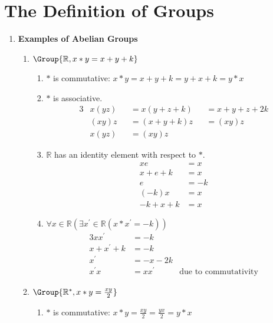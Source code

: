 \setcounter{chapter}{2}
\chapter{The Definition of Groups}
\label{ch:the-definition-of-groups}

\begin{enumerate}[label={\Alph*.},font={\bfseries}]
\item {\bf Examples of Abelian Groups}
  \begin{enumerate}[label={\arabic*},font={\bfseries}]
  \item $\Group{\mathbb{R}, x*y=x+y+k}$
    \begin{enumerate}[label={(\roman*)}]
    \item $*$ is commutative:
      $x*y=x+y+k = y+x+k=y*x$
    \item $*$ is associative.
      \begin{alignat*}{3}
        & x(yz) &&= x(y+z+k) &&= x+y+z+2k \\
        & (xy)z &&= (x+y+k)z &&= (xy)z \\
        & x(yz) &&= (xy)z
      \end{alignat*}
    \item $\mathbb{R}$ has an identity element with respect to $*$.
      \begin{align*}
        xe &= x \\
        x+e+k &= x \\
        e &= -k \\
        (-k)x &= x \\
        -k+x+k &= x
      \end{align*}
    \item $\forall x\in\mathbb{R}(\exists x^\prime\in\mathbb{R}(x*x^\prime=-k))$
      \begin{alignat*}{3}
        xx^\prime &= -k \\
        x+x^\prime+k &= -k \\
        x^\prime &= -x-2k \\
        x^{\prime}x &= xx^\prime & \text{due to commutativity}
      \end{alignat*}
    \end{enumerate}
  \item $\Group{\mathbb{R}^*, x*y=\frac{xy}{2}}$
    \begin{enumerate}[label={(\roman*)}]
    \item $*$ is commutative:
      $x*y=\frac{xy}{2} = \frac{yx}{2}=y*x$

\end{enumerate}
\end{enumerate}
\end{enumerate}
